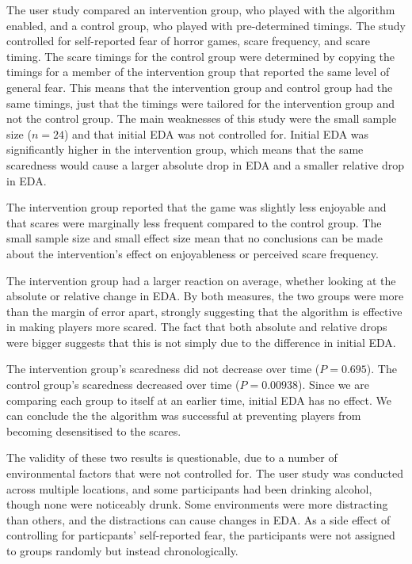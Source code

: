 \documentclass[12pt,a4paper]{article}\usepackage[]{graphicx}\usepackage[]{color}
\begin{document}
The user study compared an intervention group, who played with the algorithm enabled, and a control group, who played with pre-determined timings.
The study controlled for self-reported fear of horror games, scare frequency, and scare timing.
The scare timings for the control group were determined by copying the timings for a member of the intervention group that reported the same level of general fear.
This means that the intervention group and control group had the same timings, just that the timings were tailored for the intervention group and not the control group.
The main weaknesses of this study were the small sample size ($n=24$) and that initial EDA was not controlled for.
Initial EDA was significantly higher in the intervention group, which means that the same scaredness would cause a larger absolute drop in EDA and a smaller relative drop in EDA.

The intervention group reported that the game was slightly less enjoyable and that scares were marginally less frequent compared to the control group.
The small sample size and small effect size mean that no conclusions can be made about the intervention's effect on enjoyableness or perceived scare frequency.

The intervention group had a larger reaction on average, whether looking at the absolute or relative change in EDA.
By both measures, the two groups were more than the margin of error apart, strongly suggesting that the algorithm is effective in making players more scared.
The fact that both absolute and relative drops were bigger suggests that this is not simply due to the difference in initial EDA.

The intervention group's scaredness did not decrease over time ($P = 0.695$).
The control group's scaredness decreased over time ($P = 0.00938$).
Since we are comparing each group to itself at an earlier time, initial EDA has no effect.
We can conclude the the algorithm was successful at preventing players from becoming desensitised to the scares.

The validity of these two results is questionable, due to a number of environmental factors that were not controlled for.
The user study was conducted across multiple locations, and some participants had been drinking alcohol, though none were noticeably drunk.
Some environments were more distracting than others, and the distractions can cause changes in EDA.
As a side effect of controlling for particpants' self-reported fear, the participants were not assigned to groups randomly but instead chronologically.
\end{document}
